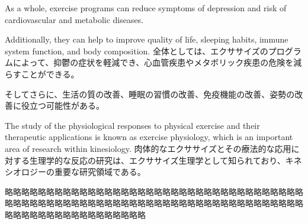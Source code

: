 \documentclass[uplatex,dvipdfmx]{jsarticle} \usepackage{amsmath,amssymb,bm}
\begin{document}
\vspace{\baselineskip}
\begin{paracol}{2}
As a whole, exercise programs can reduce symptoms of depression and risk of cardiovascular and metabolic diseases.

Additionally, they can help to improve quality of life, sleeping habits, immune system function, and body composition.
\switchcolumn
全体としては、エクササイズのプログラムによって、抑鬱の症状を軽減でき、心血管疾患やメタボリック疾患の危険を減らすことができる。

そしてさらに、生活の質の改善、睡眠の習慣の改善、免疫機能の改善、姿勢の改善に役立つ可能性がある。
\end{paracol}
\vspace{\baselineskip}
\begin{paracol}{2}
The study of the physiological responses to physical exercise and their therapeutic applications is known as exercise physiology, which is an important area of research within kinesiology.
\switchcolumn
肉体的なエクササイズとその療法的な応用に対する生理学的な反応の研究は、エクササイズ生理学として知られており、キネシオロジーの重要な研究領域である。
\end{paracol}
略略略略略略略略略略略略略略略略略略略略略略略略略略略略略略略略略略略略略略略略略略略略略略略略略略略略略略略略略略略略略略略略略略略略略略略略略略略略略略略略略略略略略略略略略


\vspace{\baselineskip}
\begin{paracol}{2}
\switchcolumn
\end{paracol}
\end{document}
